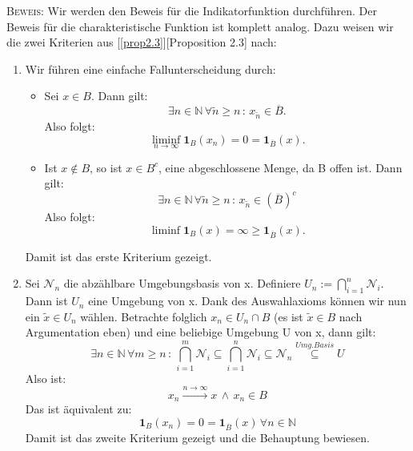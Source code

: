 \textsc{Beweis:}
Wir werden den Beweis für die Indikatorfunktion durchführen. Der Beweis für die charakteristische Funktion ist komplett analog. Dazu weisen wir die zwei Kriterien aus [\ref{prop2.3}][Proposition 2.3] nach:
\begin{enumerate}
    \item Wir führen eine einfache Fallunterscheidung durch:
    \begin{itemize}
        \item Sei \(x \in B\). Dann gilt:
        \begin{equation}
            \exists n \in \mathbb{N} \, \forall \tilde{n} \geq n \,: \, x_{\tilde{n}} \in \overline{B}.
        \end{equation}
        Also folgt:
        \begin{equation}
            \liminf_{n \to \infty} \mathbf{1}_B (x_n) = 0 = \mathbf{1}_{\overline{B}}(x).
        \end{equation}
        \item Ist \(x \notin B\), so ist \(x \in B^c\), eine abgeschlossene Menge, da B offen ist. Dann gilt:
        \begin{equation}
            \exists n \in \mathbb{N} \, \forall \tilde{n} \geq n \,:\, x_{\tilde{n}} \in (\overline{B})^c
        \end{equation}
        Also folgt:
        \begin{equation}
            \liminf \mathbf{1}_B(x) = \infty \geq \mathbf{1}_{\overline{B}}(x).
        \end{equation}
    \end{itemize}
    Damit ist das erste Kriterium gezeigt.
    \item Sei \(\mathcal{N}_n\) die abzählbare Umgebungsbasis von x. Definiere \(U_n := \bigcap_{i=1}^n \mathcal{N}_i\). Dann ist \(U_n\) eine Umgebung von x. Dank des Auswahlaxioms können wir nun ein \(\tilde{x} \in U_n\) wählen. Betrachte folglich \(x_n \in U_n \cap B\) (es ist \(\tilde{x} \in B\) nach Argumentation eben) und eine beliebige Umgebung U von x, dann gilt:
    \begin{equation}
        \exists n \in \mathbb{N} \, \forall m \geq n \,:\, \bigcap_{i=1}^m \mathcal{N}_i \subseteq \bigcap_{i=1}^n \mathcal{N}_i \subseteq \mathcal{N}_n \stackrel{Umg.Basis}{\subseteq} U
    \end{equation}
    Also ist:
    \begin{equation}
        x_n \stackrel{n \to \infty}{\to} x\, \land \, x_n \in B
    \end{equation}
    Das ist äquivalent zu:
    \begin{equation}
        \mathbf{1}_B(x_n) = 0 = \mathbf{1}_{\overline{B}}(x) \, \forall n \in \mathbb{N}
    \end{equation}
    Damit ist das zweite Kriterium gezeigt und die Behauptung bewiesen.\QEDB
\end{enumerate}
